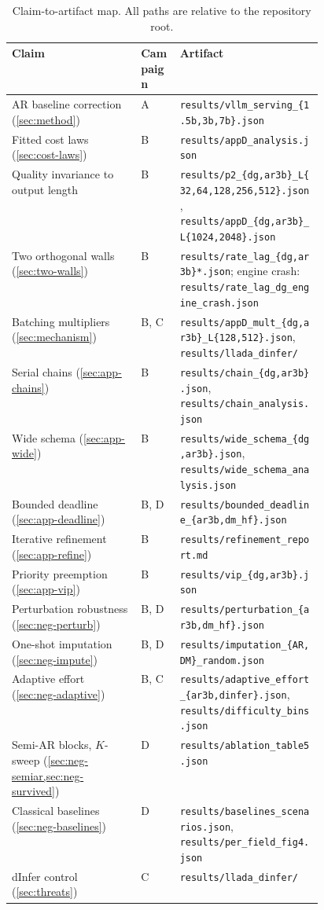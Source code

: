 \begin{table}[t]
  \centering
  \small
  \caption{Claim-to-artifact map. All paths are relative to the repository root.}
  \label{tab:artifacts}
  \begin{tabular}{llp{0.46\linewidth}}
    \toprule
    Claim & Campaign & Artifact\\
    \midrule
    AR baseline correction (\cref{sec:method})
      & A & \texttt{results/vllm\_serving\_\{1.5b,3b,7b\}.json}\\
    Fitted cost laws (\cref{sec:cost-laws})
      & B & \texttt{results/appD\_analysis.json}\\
    Quality invariance to output length
      & B & \texttt{results/p2\_\{dg,ar3b\}\_L\{32,64,128,256,512\}.json},
            \texttt{results/appD\_\{dg,ar3b\}\_L\{1024,2048\}.json}\\
    Two orthogonal walls (\cref{sec:two-walls})
      & B & \texttt{results/rate\_lag\_\{dg,ar3b\}*.json};
            engine crash: \texttt{results/rate\_lag\_dg\_engine\_crash.json}\\
    Batching multipliers (\cref{sec:mechanism})
      & B, C & \texttt{results/appD\_mult\_\{dg,ar3b\}\_L\{128,512\}.json},
            \texttt{results/llada\_dinfer/}\\
    Serial chains (\cref{sec:app-chains})
      & B & \texttt{results/chain\_\{dg,ar3b\}.json},
            \texttt{results/chain\_analysis.json}\\
    Wide schema (\cref{sec:app-wide})
      & B & \texttt{results/wide\_schema\_\{dg,ar3b\}.json},
            \texttt{results/wide\_schema\_analysis.json}\\
    Bounded deadline (\cref{sec:app-deadline})
      & B, D & \texttt{results/bounded\_deadline\_\{ar3b,dm\_hf\}.json}\\
    Iterative refinement (\cref{sec:app-refine})
      & B & \texttt{results/refinement\_report.md}\\
    Priority preemption (\cref{sec:app-vip})
      & B & \texttt{results/vip\_\{dg,ar3b\}.json}\\
    Perturbation robustness (\cref{sec:neg-perturb})
      & B, D & \texttt{results/perturbation\_\{ar3b,dm\_hf\}.json}\\
    One-shot imputation (\cref{sec:neg-impute})
      & B, D & \texttt{results/imputation\_\{AR,DM\}\_random.json}\\
    Adaptive effort (\cref{sec:neg-adaptive})
      & B, C & \texttt{results/adaptive\_effort\_\{ar3b,dinfer\}.json},
            \texttt{results/difficulty\_bins.json}\\
    Semi-AR blocks, $K$-sweep (\cref{sec:neg-semiar,sec:neg-survived})
      & D & \texttt{results/ablation\_table5.json}\\
    Classical baselines (\cref{sec:neg-baselines})
      & D & \texttt{results/baselines\_scenarios.json},
            \texttt{results/per\_field\_fig4.json}\\
    dInfer control (\cref{sec:threats})
      & C & \texttt{results/llada\_dinfer/}\\
    \bottomrule
  \end{tabular}
\end{table}

